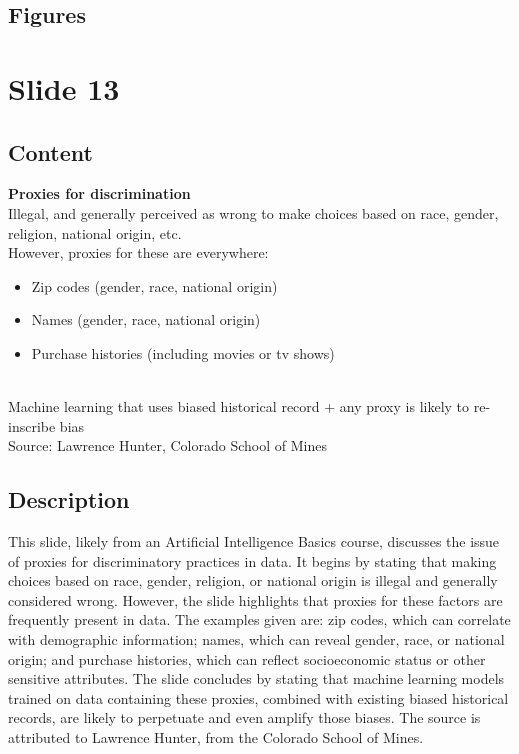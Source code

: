 \documentclass{article}%
\begin{document}
\subsection{Figures}%
\begin{figure}[H]%
\centering%
\end{figure}

%
\newpage%
\section{Slide 13}%
\label{sec:Slide13}%
\subsection{Content}%

\textbf{Proxies for discrimination} \\
Illegal, and generally perceived as wrong to make choices based on race, gender, religion, national origin, etc. \\
However, proxies for these are everywhere: \\
\begin{itemize}
    \item Zip codes (gender, race, national origin)
    \item Names (gender, race, national origin)
    \item Purchase histories (including movies or tv shows)
\end{itemize} \\
Machine learning that uses biased historical record + any proxy is likely to re-inscribe bias \\
Source: Lawrence Hunter, Colorado School of Mines
%
\subsection{Description}%
This slide, likely from an Artificial Intelligence Basics course, discusses the issue of proxies for discriminatory practices in data.  It begins by stating that making choices based on race, gender, religion, or national origin is illegal and generally considered wrong.  However, the slide highlights that proxies for these factors are frequently present in data.  The examples given are: zip codes, which can correlate with demographic information; names, which can reveal gender, race, or national origin; and purchase histories, which can reflect socioeconomic status or other sensitive attributes.  The slide concludes by stating that machine learning models trained on data containing these proxies, combined with existing biased historical records, are likely to perpetuate and even amplify those biases.  The source is attributed to Lawrence Hunter, from the Colorado School of Mines.%
\end{document}

